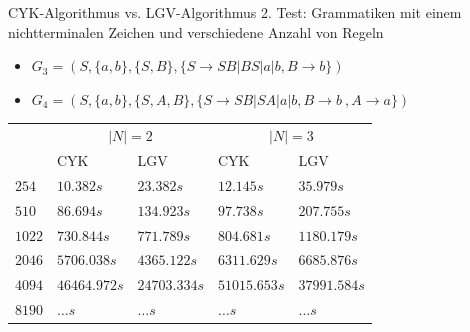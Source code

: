 \documentclass{beamer}
\begin{document}
	\begin{frame}{CYK-Algorithmus vs. LGV-Algorithmus}
		2. Test: Grammatiken mit einem nichtterminalen Zeichen und verschiedene Anzahl von Regeln
		\pause
		\begin{itemize}
			\item $G_3 = (S, \{a,b\}, \{S,B\}, \{S\to SB | BS | a | b ,B\to b\})$
			\item $G_4 = (S, \{a,b\}, \{S,A,B\}, \{S\to SB | SA | a | b ,B\to b\ ,A\to a\})$
		\end{itemize}
		\pause
		\begin{table}[H]
			\centering
			\begin{tabular}{|m{2cm}||m{1.7cm}|m{1.7cm}||m{1.7cm}|m{1.7cm}|}  
				\hline
				\multirow{2}{*}{\diagbox[width=\dimexpr \textwidth/8+4.5\tabcolsep\relax, height=1cm]{$|w|$}{$Grammatik$}}& \multicolumn{2}{c||}{$|N|=2$}  & \multicolumn{2}{c|}{$|N|=3$}\\ [0.5ex] 
				\cline{2-5}
				& CYK & LGV & CYK & LGV \\
				\hline\hline
				$254$ & $10.382s$& $23.382s$&$12.145s$& $35.979s$\\[1ex]
				\hline
				$510$ & $86.694s$& $134.923s$& $97.738s$& $207.755s$\\[1ex]
				\hline
				$1022$ & $730.844s$& \cellcolor{lightgray}$771.789s$& $804.681s$& $1180.179s$\\[1ex]
				\hline
				$2046$ & $5706.038s$& \cellcolor{green}$4365.122s$&$6311.629s$& \cellcolor{lightgray}$6685.876s$\\[1ex]
				\hline
				$4094$ & $46464.972s$& $24703.334s$& $51015.653s$& \cellcolor{green}$37991.584s$\\[1ex]
				\hline
				$8190$ & $\ldots s$& $\ldots s$& $\ldots s$& $\ldots s$\\[1ex]
				\hline
			\end{tabular}
		\end{table}
	\end{frame}
	
	
\end{document}
